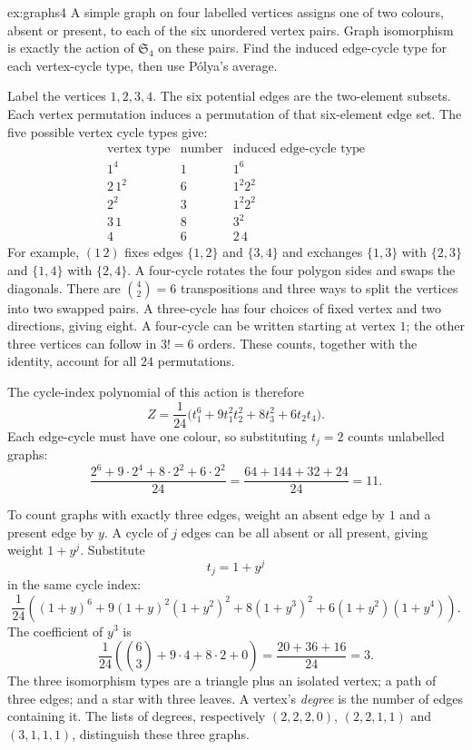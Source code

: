 \begin{solution}{ex:graphs4}
\idea A simple graph on four labelled vertices assigns one of two colours, absent or present, to each of the six unordered vertex pairs. Graph isomorphism is exactly the action of $\mathfrak S_4$ on these pairs. Find the induced edge-cycle type for each vertex-cycle type, then use P\'olya's average.

\writeup Label the vertices $1,2,3,4$. The six potential edges are the two-element subsets. Each vertex permutation induces a permutation of that six-element edge set. The five possible vertex cycle types give:
\[
\begin{array}{c|c|c}
\text{vertex type}&\text{number}&\text{induced edge-cycle type}\\\hline
1^4&1&1^6\\
2\,1^2&6&1^2 2^2\\
2^2&3&1^2 2^2\\
3\,1&8&3^2\\
4&6&2\,4
\end{array}
\]
For example, $(1\,2)$ fixes edges $\{1,2\}$ and $\{3,4\}$ and exchanges $\{1,3\}$ with $\{2,3\}$ and $\{1,4\}$ with $\{2,4\}$. A four-cycle rotates the four polygon sides and swaps the diagonals.
There are $\binom42=6$ transpositions and three ways to split the vertices
into two swapped pairs. A three-cycle has four choices of fixed vertex and
two directions, giving eight. A four-cycle can be written starting at vertex
$1$; the other three vertices can follow in $3!=6$ orders. These counts,
together with the identity, account for all $24$ permutations.

The cycle-index polynomial of this action is therefore
\[
Z=\frac1{24}\bigl(t_1^6+9t_1^2t_2^2+8t_3^2+6t_2t_4\bigr).
\]
Each edge-cycle must have one colour, so substituting $t_j=2$ counts unlabelled graphs:
\[
\boxed{\frac{2^6+9\cdot2^4+8\cdot2^2+6\cdot2^2}{24}
=\frac{64+144+32+24}{24}=11}.
\]

To count graphs with exactly three edges, weight an absent edge by $1$ and a present edge by $y$. A cycle of $j$ edges can be all absent or all present, giving weight $1+y^j$. Substitute
\[
t_j=1+y^j
\]
in the same cycle index:
\[
\frac1{24}\left((1+y)^6+9(1+y)^2(1+y^2)^2
 +8(1+y^3)^2+6(1+y^2)(1+y^4)\right).
\]
The coefficient of $y^3$ is
\[
\frac1{24}\left(\binom63+9\cdot4+8\cdot2+0\right)
=\frac{20+36+16}{24}=\boxed{3}.
\]
The three isomorphism types are a triangle plus an isolated vertex; a path of three edges; and a star with three leaves. A vertex's \emph{degree} is the number of edges containing it. The lists of degrees, respectively $(2,2,2,0)$, $(2,2,1,1)$ and $(3,1,1,1)$, distinguish these three graphs.
\end{solution}

